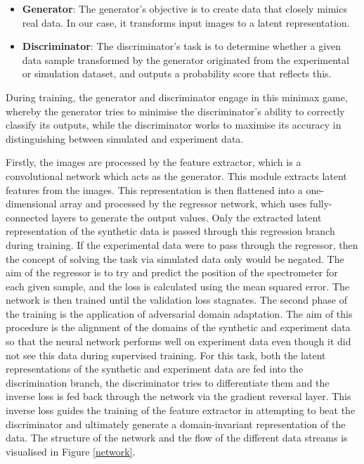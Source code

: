 \documentclass{iopconfser}
\begin{document}
\begin{itemize}
    \item \textbf{Generator}: The generator's objective is to create data that closely mimics real data. In our case, it transforms input images to a latent representation.
    \item \textbf{Discriminator}: The discriminator's task is to determine whether a given data sample transformed by the generator originated from the experimental or simulation dataset, and outputs a probability score that reflects this.
\end{itemize}

During training, the generator and discriminator engage in this minimax game, whereby the generator tries to minimise the discriminator's ability to correctly classify its outputs, while the discriminator works to maximise its accuracy in distinguishing between simulated and experiment data.

Firstly, the images are processed by the feature extractor, which is a convolutional network which acts as the generator. This module extracts latent features from the images. This representation is then flattened into a one-dimensional array and processed by the regressor network, which uses fully-connected layers to generate the output values. Only the extracted latent representation of the synthetic data is passed through this regression branch during training. If the experimental data were to pass through the regressor, then the concept of solving the task via simulated data only would be negated. The aim of the regressor is to try and predict the position of the spectrometer for each given sample, and the loss is calculated using the mean squared error. The network is then trained until the validation loss stagnates. The second phase of the training is the application of adversarial domain adaptation. The aim of this procedure is the alignment of the domains of the synthetic and experiment data so that the neural network performs well on experiment data even though it did not see this data during supervised training. For this task, both the latent representations of the synthetic and experiment data are fed into the discrimination branch, the discriminator tries to differentiate them and the inverse loss is fed back through the network via the gradient reversal layer. This inverse loss guides the training of the feature extractor in attempting to beat the discriminator and ultimately generate a domain-invariant representation of the data. The structure of the network and the flow of the different data streams is visualised in Figure \ref{network}.
\end{document}
